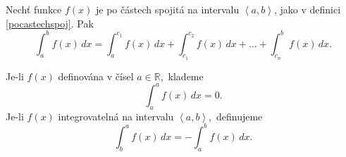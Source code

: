 \begin{veta}
Nechť funkce $f(x)$ je po částech spojitá na intervalu $\left < a,b \right > $, jako
v definici \ref{pocastechspoj}. Pak
$$\int_a^b f(x)\, dx = \int_a^{c_1}f(x)\, dx + \int_{c_1}^{c_2}f(x)\, dx + \dots + \int_{c_n}^b f(x)\, dx.$$
\end{veta}

\begin{definition}
Je-li $f(x)$ definována v čísel $a \in \mathbb R,$ klademe
$$\int _a ^a f(x)\, dx = 0.$$
Je-li $f(x)$ integrovatelná na intervalu $\left < a,b \right > ,$ definujeme
$$\int_b^a f(x)\, dx = -\int_a^b f(x)\, dx.$$
\end{definition}
